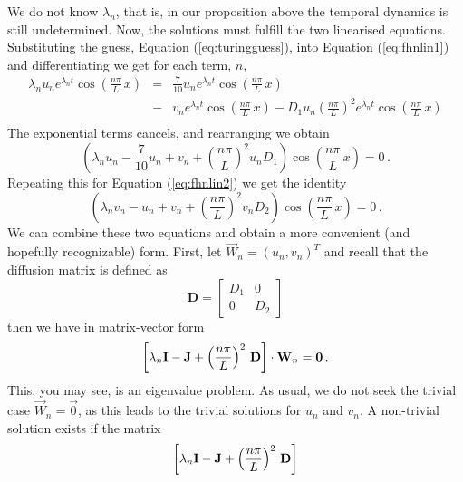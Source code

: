 We do not know $\lambda_n$, that is, in our proposition above the temporal dynamics is still undetermined. 
Now, the solutions must fulfill the two linearised equations. Substituting the guess, Equation (\ref{eq:turingguess}), 
into Equation (\ref{eq:fhnlin1}) and differentiating we get for each term, $n$, 
\begin{eqnarray}
	\lambda_n u_n e^{\lambda_n t} \cos\left(\frac{n\pi}{L} \, x\right) 
	&=& \frac{7}{10}u_n e^{\lambda_n t} \cos\left(\frac{n\pi}{L} \, x\right)  \nonumber \\
	&-& v_n e^{\lambda_n t} \cos\left(\frac{n\pi}{L} \, x\right) 
	- D_1 u_n \left(\frac{n\pi}{L}\right)^2 e^{\lambda_n t} \cos\left(\frac{n\pi}{L} \, x\right)
	\nonumber \\
\end{eqnarray}
The exponential terms cancels, and rearranging we obtain
\begin{equation}
	\left(
		\lambda_n u_n -\frac{7}{10} u_n + v_n + \left(\frac{n\pi}{L}\right)^2 u_n D_1
	\right) \cos\left(\frac{n\pi}{L} \, x\right) = 0 \, . 
\end{equation}
Repeating this for Equation (\ref{eq:fhnlin2}) we get the identity 
\begin{equation}
	\left( \lambda_n v_n - u_n + v_n + \left(\frac{n\pi}{L}\right)^2 v_n D_2
	\right) \cos\left(\frac{n\pi}{L} \, x\right) = 0 \, .
\end{equation}
We can combine these two equations and obtain a more convenient (and hopefully recognizable) form. 
First, let $\vec{W}_n = (u_n, v_n)^T$ and recall that the 
diffusion matrix is defined as
\begin{equation}
	\mathbf{D} =
	\begin{bmatrix}
	D_1 & 0 \\
	0 & D_2
	\end{bmatrix}
\end{equation}
then we have in matrix-vector form
\begin{equation}
	\left[
		\lambda_n \mathbf{I} - \mathbf{J} + \left(\frac{n\pi}{L}\right)^2 \, \mathbf{D}
	\right] \cdot \mathbf{W}_n = \mathbf{0} \, .
\end{equation}
This, you may see, is an eigenvalue problem. As usual, we do not seek the trivial case 
$\vec{W}_n=\vec{0}$, as this leads to the trivial solutions for $u_n$ and $v_n$. 
A non-trivial solution exists if the matrix
\begin{equation}
	\left[
		\lambda_n \mathbf{I} - \mathbf{J} + \left(\frac{n\pi}{L}\right)^2 \, \mathbf{D}
	\right]
\end{equation}
